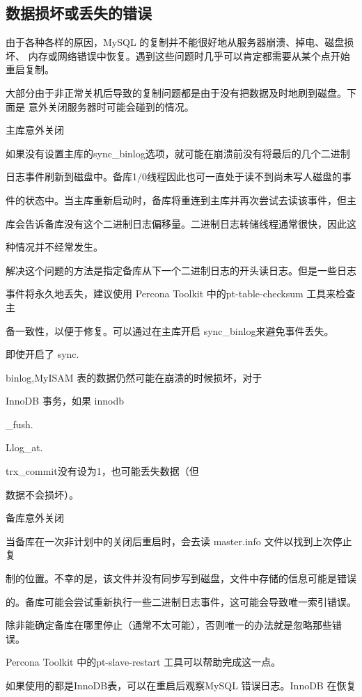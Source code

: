 \subsection{数据损坏或丢失的错误}
由于各种各样的原因，MySQL 的复制并不能很好地从服务器崩溃、掉电、磁盘损坏、
内存或网络错误中恢复。遇到这些问题时几乎可以肯定都需要从某个点开始重启复制。

大部分由于非正常关机后导致的复制问题都是由于没有把数据及时地刷到磁盘。下面是
意外关闭服务器时可能会碰到的情况。

主库意外关闭

如果没有设置主库的sync\_binlog选项，就可能在崩溃前没有将最后的几个二进制

日志事件刷新到磁盘中。备库1/0线程因此也可一直处于读不到尚未写人磁盘的事

件的状态中。当主库重新启动时，备库将重连到主库并再次尝试去读该事件，但主

库会告诉备库没有这个二进制日志偏移量。二进制日志转储线程通常很快，因此这

种情况并不经常发生。

解决这个问题的方法是指定备库从下一个二进制日志的开头读日志。但是一些日志

事件将永久地丢失，建议使用 Percona Toolkit 中的pt-table-checksum 工具来检查主

备一致性，以便于修复。可以通过在主库开启 sync\_binlog来避免事件丢失。

即使开启了 sync.

binlog,MyISAM 表的数据仍然可能在崩溃的时候损坏，对于

InnoDB 事务，如果 innodb

\_fush.

Llog\_at.

trx\_commit没有设为1，也可能丢失数据（但

数据不会损坏）。

备库意外关闭

当备库在一次非计划中的关闭后重启时，会去读 master.info 文件以找到上次停止复

制的位置。不幸的是，该文件并没有同步写到磁盘，文件中存储的信息可能是错误

的。备库可能会尝试重新执行一些二进制日志事件，这可能会导致唯一索引错误。

除非能确定备库在哪里停止（通常不太可能），否则唯一的办法就是忽略那些错误。

Percona Toolkit 中的pt-slave-restart 工具可以帮助完成这一点。

如果使用的都是InnoDB表，可以在重启后观察MySQL 错误日志。InnoDB 在恢复

